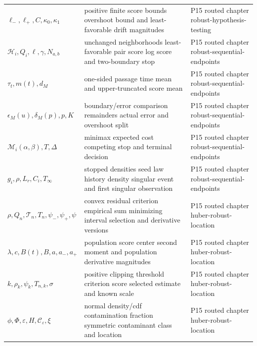 \begin{longtable}{@{}p{}p{}p{}@{}}
\(\ell_-,\allowbreak \ell_+,\allowbreak C,\allowbreak \kappa_0,\allowbreak \kappa_1\) & positive finite score bounds overshoot bound and least-favorable drift magnitudes & P15 routed chapter robust-\allowbreak{}hypothesis-\allowbreak{}testing \\
\(\mathcal H_i,\allowbreak Q_i,\allowbreak \ell,\allowbreak \gamma,\allowbreak N_{a,b}\) & unchanged neighborhoods least-favorable pair score log score and two-boundary stop & P15 routed chapter robust-\allowbreak{}sequential-\allowbreak{}endpoints \\
\(\tau_t,\allowbreak m(t),\allowbreak d_M\) & one-sided passage time mean and upper-truncated score mean & P15 routed chapter robust-\allowbreak{}sequential-\allowbreak{}endpoints \\
\(\epsilon_M(u),\allowbreak \delta_M(p),\allowbreak p,\allowbreak K\) & boundary/error comparison remainders actual error and overshoot split & P15 routed chapter robust-\allowbreak{}sequential-\allowbreak{}endpoints \\
\(\mathcal M_i(\alpha,\allowbreak \beta),\allowbreak T,\allowbreak \Delta\) & minimax expected cost competing stop and terminal decision & P15 routed chapter robust-\allowbreak{}sequential-\allowbreak{}endpoints \\
\(g_i,\allowbreak \rho,\allowbreak L_r,\allowbreak C_i,\allowbreak T_\infty\) & stopped densities seed law history density singular event and first singular observation & P15 routed chapter robust-\allowbreak{}sequential-\allowbreak{}endpoints \\
\(\rho,\allowbreak Q_n,\allowbreak \mathcal T_n,\allowbreak T_n,\allowbreak \psi_-,\allowbreak \psi_+,\allowbreak \psi\) & convex residual criterion empirical sum minimizing interval selection and derivative versions & P15 routed chapter huber-\allowbreak{}robust-\allowbreak{}location \\
\(\lambda,\allowbreak c,\allowbreak B(t),\allowbreak B,\allowbreak a,\allowbreak a_-,\allowbreak a_+\) & population score center second moment and population derivative magnitudes & P15 routed chapter huber-\allowbreak{}robust-\allowbreak{}location \\
\(k,\allowbreak \rho_k,\allowbreak \psi_k,\allowbreak T_{n,k},\allowbreak \sigma\) & positive clipping threshold criterion score selected estimate and known scale & P15 routed chapter huber-\allowbreak{}robust-\allowbreak{}location \\
\(\phi,\allowbreak \Phi,\allowbreak \varepsilon,\allowbreak H,\allowbreak \mathcal C_\varepsilon,\allowbreak \xi\) & normal density/cdf contamination fraction symmetric contaminant class and location & P15 routed chapter huber-\allowbreak{}robust-\allowbreak{}location \\

\end{longtable}
